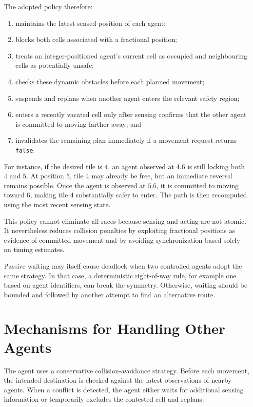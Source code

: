 \documentclass[a4paper]{article}
\begin{document}
The adopted policy therefore:

\begin{enumerate}
    \item maintains the latest sensed position of each agent;
    \item blocks both cells associated with a fractional position;
    \item treats an integer-positioned agent's current cell as occupied and
          neighbouring cells as potentially unsafe;
    \item checks these dynamic obstacles before each planned movement;
    \item suspends and replans when another agent enters the relevant safety
          region;
    \item enters a recently vacated cell only after sensing confirms that the
          other agent is committed to moving farther away; and
    \item invalidates the remaining plan immediately if a movement request
          returns \texttt{false}.
\end{enumerate}

For instance, if the desired tile is $4$, an agent observed at $4.6$ is still
locking both $4$ and $5$. At position $5$, tile $4$ may already be free, but an
immediate reversal remains possible. Once the agent is observed at $5.6$, it
is committed to moving toward $6$, making tile $4$ substantially safer to
enter. The path is then recomputed using the most recent sensing state.

This policy cannot eliminate all races because sensing and acting are not
atomic. It nevertheless reduces collision penalties by exploiting fractional
positions as evidence of committed movement and by avoiding synchronization
based solely on timing estimates.

Passive waiting may itself cause deadlock when two controlled agents adopt the
same strategy. In that case, a deterministic right-of-way rule, for example
one based on agent identifiers, can break the symmetry. Otherwise, waiting
should be bounded and followed by another attempt to find an alternative
route.

\section{Mechanisms for Handling Other Agents}
\label{sec:agent-handling}

The agent uses a conservative collision-avoidance strategy. Before each
movement, the intended destination is checked against the latest observations
of nearby agents. When a conflict is detected, the agent either waits for
additional sensing information or temporarily excludes the contested cell and
replans.
\end{document}
